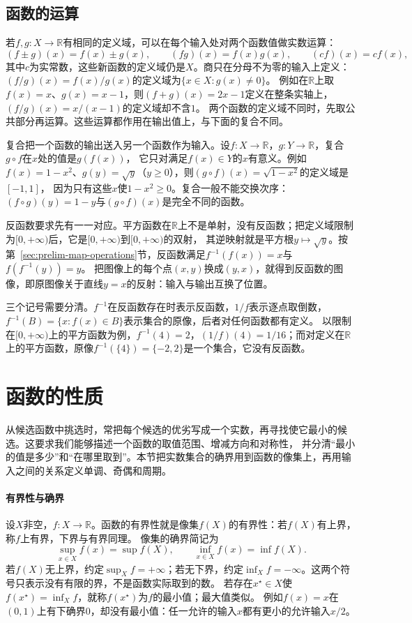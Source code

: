 \subsection{函数的运算}
\label{sec:ru-function-arithmetic}
\label{sec:real-function-arithmetic}

若$f,g:X\to\mathbb R$有相同的定义域，可以在每个输入处对两个函数值做实数运算：
\[
 (f\pm g)(x)=f(x)\pm g(x),\qquad (fg)(x)=f(x)g(x),\qquad (cf)(x)=cf(x),
\]
其中$c$为实常数，这些新函数的定义域仍是$X$。商只在分母不为零的输入上定义：$(f/g)(x)=f(x)/g(x)$的定义域为$\{x\in X:g(x)\neq0\}$。
例如在$\mathbb R$上取$f(x)=x$、$g(x)=x-1$，则$(f+g)(x)=2x-1$定义在整条实轴上，$(f/g)(x)=x/(x-1)$的定义域却不含$1$。
两个函数的定义域不同时，先取公共部分再运算。这些运算都作用在输出值上，与下面的复合不同。

复合把一个函数的输出送入另一个函数作为输入。设$f:X\to\mathbb R$，$g:Y\to\mathbb R$，复合$g\circ f$在$x$处的值是$g(f(x))$，
它只对满足$f(x)\in Y$的$x$有意义。例如$f(x)=1-x^2$、$g(y)=\sqrt y$（$y\geq0$），则$(g\circ f)(x)=\sqrt{1-x^2}$的定义域是$[-1,1]$，
因为只有这些$x$使$1-x^2\geq0$。复合一般不能交换次序：$(f\circ g)(y)=1-y$与$(g\circ f)(x)$是完全不同的函数。

反函数要求先有一一对应。平方函数在$\mathbb R$上不是单射，没有反函数；把定义域限制为$[0,+\infty)$后，它是$[0,+\infty)$到$[0,+\infty)$的双射，
其逆映射就是平方根$y\mapsto\sqrt y$。按第~\ref{sec:prelim-map-operations}节，反函数满足$f^{-1}(f(x))=x$与$f(f^{-1}(y))=y$。
把图像上的每个点$(x,y)$换成$(y,x)$，就得到反函数的图像，即原图像关于直线$y=x$的反射：输入与输出互换了位置。

三个记号需要分清。$f^{-1}$在反函数存在时表示反函数，$1/f$表示逐点取倒数，$f^{-1}(B)=\{x:f(x)\in B\}$表示集合的原像，后者对任何函数都有定义。
以限制在$[0,+\infty)$上的平方函数为例，$f^{-1}(4)=2$，$(1/f)(4)=1/16$；而对定义在$\mathbb R$上的平方函数，原像$f^{-1}(\{4\})=\{-2,2\}$是一个集合，它没有反函数。
\section{函数的性质}
\label{sec:prelim-optimal-values-errors}
\label{sec:ru-function-properties}

从候选函数中挑选时，常把每个候选的优劣写成一个实数，再寻找使它最小的候选。这要求我们能够描述一个函数的取值范围、增减方向和对称性，
并分清“最小的值是多少”和“在哪里取到”。本节把实数集合的确界用到函数的像集上，再用输入之间的关系定义单调、奇偶和周期。

\paragraph{有界性与确界}
设$X$非空，$f:X\to\mathbb R$。函数的有界性就是像集$f(X)$的有界性：若$f(X)$有上界，称$f$上有界，下界与有界同理。
像集的确界简记为
\[
 \sup_{x\in X}f(x)=\sup f(X),\qquad \inf_{x\in X}f(x)=\inf f(X).
\]
若$f(X)$无上界，约定$\sup_Xf=+\infty$；若无下界，约定$\inf_Xf=-\infty$。这两个符号只表示没有有限的界，不是函数实际取到的数。
若存在$x^\star\in X$使$f(x^\star)=\inf_Xf$，就称$f(x^\star)$为$f$的最小值；最大值类似。
例如$f(x)=x$在$(0,1)$上有下确界$0$，却没有最小值：任一允许的输入$x$都有更小的允许输入$x/2$。

